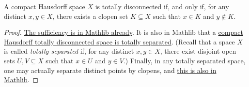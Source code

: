 \documentclass[a4paper,10pt]{article}
\numberwithin{theorem}{section}
\begin{document}
\begin{lemma}\label{BoolSpchar}
A compact Hausdorff space $X$ is totally disconnected if, and only if, for any
distinct $x, y \in X$, there exists a clopen set $K \subseteq X$ such that $x
\in K$ and $y \not\in K$.
\end{lemma}
\begin{proof}
   \href{https://leanprover-community.github.io/mathlib4_docs/Mathlib/Topology/Connected/TotallyDisconnected.html#isTotallyDisconnected_of_isClopen_set}{The
    sufficiency is in Mathlib already}. It is also in Mathlib that a
    \href{https://leanprover-community.github.io/mathlib4_docs/Mathlib/Topology/Separation.html#instTotallySeparatedSpace}{compact
    Hausdorff totally disconnected space is totally separated}.
    (Recall that a space $X$ is called \emph{totally separated} if,
for any distinct $x,y \in X$, there exist disjoint open sets $U, V \subseteq
X$ such that $x \in U$ and $y \in V$.) Finally,
    in any totally separated space, one may actually separate distinct points by clopens, and
    \href{https://leanprover-community.github.io/mathlib4_docs/Mathlib/Topology/Connected/TotallyDisconnected.html#exists_isClopen_of_totally_separated}{this is also in Mathlib}.
\end{proof}
\end{document}
